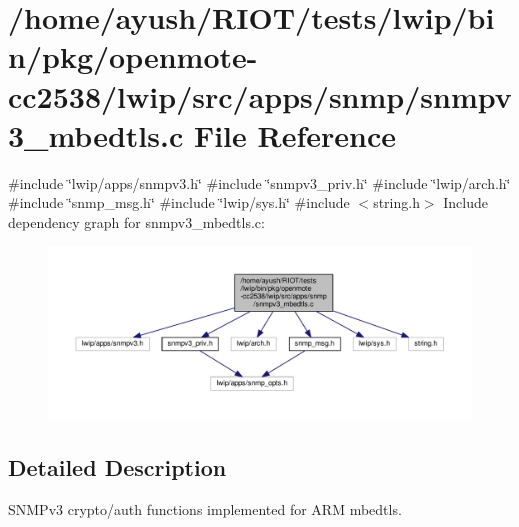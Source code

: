 \hypertarget{openmote-cc2538_2lwip_2src_2apps_2snmp_2snmpv3__mbedtls_8c}{}\section{/home/ayush/\+R\+I\+O\+T/tests/lwip/bin/pkg/openmote-\/cc2538/lwip/src/apps/snmp/snmpv3\+\_\+mbedtls.c File Reference}
\label{openmote-cc2538_2lwip_2src_2apps_2snmp_2snmpv3__mbedtls_8c}
{\ttfamily \#include \char`\"{}lwip/apps/snmpv3.\+h\char`\"{}}\newline
{\ttfamily \#include \char`\"{}snmpv3\+\_\+priv.\+h\char`\"{}}\newline
{\ttfamily \#include \char`\"{}lwip/arch.\+h\char`\"{}}\newline
{\ttfamily \#include \char`\"{}snmp\+\_\+msg.\+h\char`\"{}}\newline
{\ttfamily \#include \char`\"{}lwip/sys.\+h\char`\"{}}\newline
{\ttfamily \#include $<$string.\+h$>$}\newline
Include dependency graph for snmpv3\+\_\+mbedtls.\+c\+:
\nopagebreak
\begin{figure}[H]
\begin{center}
\leavevmode
\includegraphics[width=350pt]{openmote-cc2538_2lwip_2src_2apps_2snmp_2snmpv3__mbedtls_8c__incl}
\end{center}
\end{figure}


\subsection{Detailed Description}
S\+N\+M\+Pv3 crypto/auth functions implemented for A\+RM mbedtls. 